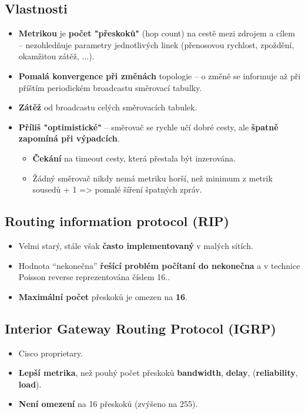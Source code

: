 \subsection*{Vlastnosti}
\begin{itemize}
    \item \textbf{Metrikou} je \textbf{počet "přeskoků"} (hop count) na cestě mezi zdrojem a cílem -- nezohledňuje parametry jednotlivých linek (přenosovou rychlost, zpoždění, okamžitou zátěž, ...).
    \item \textbf{Pomalá konvergence při změnách} topologie -- o změně se informuje až při příštím periodickém broadcastu směrovací tabulky.
    \item \textbf{Zátěž }od broadcastu celých směrovacích tabulek.
    \item \textbf{Příliš "optimistické"} -- směrovač se rychle učí dobré cesty, ale \textbf{špatně zapomíná při výpadcích}.
          \begin{itemize}
              \item \textbf{Čekání} na timeout cesty, která přestala být inzerována.
              \item Žádný směrovač nikdy nemá metriku horší, než minimum z metrik sousedů + 1 => pomalé šíření špatných zpráv.
          \end{itemize}
\end{itemize}

\subsection{Routing information protocol (RIP)}
\begin{itemize}
    \item Velmi starý, stále však \textbf{často implementovaný} v malých sítích.
    \item Hodnota “nekonečna” \textbf{řešící problém počítaní do nekonečna} a v technice Poisson reverse reprezentována číslem 16..
    \item \textbf{Maximální počet} přeskoků je omezen na \textbf{16}.
\end{itemize}

\subsection{Interior Gateway Routing Protocol (IGRP)}
\begin{itemize}
    \item Cisco proprietary.
    \item \textbf{Lepší metrika}, než pouhý počet přeskoků \textbf{bandwidth}, \textbf{delay}, (\textbf{reliability}, \textbf{load}).
    \item \textbf{Není omezení }na 16 přeskoků (zvýšeno na 255).
\end{itemize}

